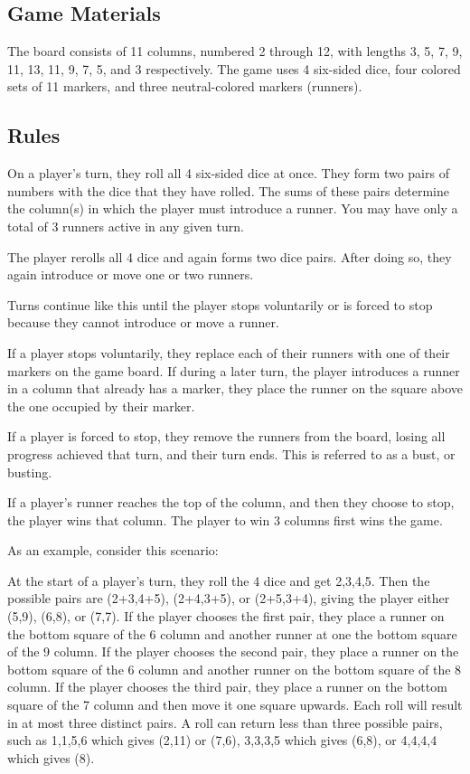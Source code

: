 \documentclass[12pt]{article}
\begin{document}
\begin{thesis}
\subsection{Game Materials}\label{game-materials}

The board consists of 11 columns, numbered 2 through 12, with lengths 3, 5, 7, 9, 11, 13, 11, 9, 7, 5, and 3 respectively.
The game uses 4 six-sided dice, four colored sets of 11 markers, and three neutral-colored markers (runners).

\subsection{Rules}\label{rules}

On a player's turn, they roll all 4 six-sided dice at once.
They form two pairs of numbers with the dice that they have rolled.
The sums of these pairs determine the column(s) in which the player must introduce a runner.
You may have only a total of 3 runners active in any given turn.

The player rerolls all 4 dice and again forms two dice pairs.
After doing so, they again introduce or move one or two runners.

Turns continue like this until the player stops voluntarily or is forced to stop because they cannot introduce or move a runner.

If a player stops voluntarily, they replace each of their runners with one of their markers on the game board.
If during a later turn, the player introduces a runner in a column that already has a marker, they place the runner on the square above the one occupied by their marker.

If a player is forced to stop, they remove the runners from the board, losing all progress achieved that turn, and their turn ends. This is referred to as a bust, or busting.

If a player's runner reaches the top of the column, and then they choose to stop, the player wins that column.
The player to win 3 columns first wins the game.

As an example, consider this scenario:

At the start of a player's turn, they roll the 4 dice and get 2,3,4,5.
Then the possible pairs are (2+3,4+5), (2+4,3+5), or (2+5,3+4), giving the player either (5,9), (6,8), or (7,7).
If the player chooses the first pair, they place a runner on the bottom square of the 6 column and another runner at one the bottom square of the 9 column.
If the player chooses the second pair, they place a runner on the bottom square of the 6 column and another runner on the bottom square of the 8 column.
If the player chooses the third pair, they place a runner on the bottom square of the 7 column and then move it one square upwards.
Each roll will result in at most three distinct pairs.
A roll can return less than three possible pairs, such as 1,1,5,6 which gives (2,11) or (7,6), 3,3,3,5 which gives (6,8), or 4,4,4,4 which gives (8).


\end{thesis}
\end{document}
